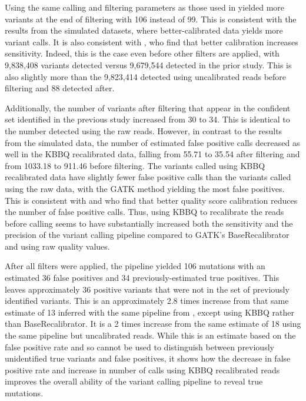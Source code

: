 Using the same calling and filtering parameters as those used in \cite{orr_phylogenomic_2020} yielded more variants at the end of filtering with 106 instead of 99. This is consistent with the results from the simulated datasets, where better-calibrated data yields more variant calls. It is also consistent with \cite{ni_improvement_2016}, who find that better calibration increases sensitivity. Indeed, this is the case even before other filters are applied, with 9,838,408 variants detected versus 9,679,544 detected in the prior study. This is also slightly more than the 9,823,414 detected using uncalibrated reads before filtering and 88 detected after.

Additionally, the number of variants after filtering that appear in the confident set identified in the previous study increased from 30 to 34. This is identical to the number detected using the raw reads. However, in contrast to the results from the simulated data, the number of estimated false positive calls decreased as well in the KBBQ recalibrated data, falling from 55.71 to 35.54 after filtering and from 1033.18 to 911.46 before filtering. The variants called using KBBQ recalibrated data have slightly fewer false positive calls than the variants called using the raw data, with the GATK method yielding the most false positives. This is consistent with \cite{ni_improvement_2016} and \cite{li_improving_2011} who find that better quality score calibration reduces the number of false positive calls. Thus, using KBBQ to recalibrate the reads before calling seems to have substantially increased both the sensitivity and the precision of the variant calling pipeline compared to GATK's BaseRecalibrator and using raw quality values.

After all filters were applied, the pipeline yielded 106 mutations with an estimated 36 false positives and 34 previously-estimated true positives. This leaves approximately 36 positive variants that were not in the set of previously identified variants. This is an approximately 2.8 times increase from that same estimate of 13 inferred with the same pipeline from \cite{orr_phylogenomic_2020}, except using KBBQ rather than BaseRecalibrator. It is a 2 times increase from the same estimate of 18 using the same pipeline but uncalibrated reads. While this is an estimate based on the false positive rate and so cannot be used to distinguish between previously unidentified true variants and false positives, it shows how the decrease in false positive rate and increase in number of calls using KBBQ recalibrated reads improves the overall ability of the variant calling pipeline to reveal true mutations.

